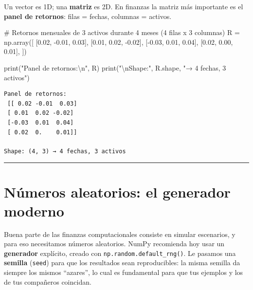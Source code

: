 \documentclass[
  spanish,
  letterpaper,
  DIV=11,
  numbers=noendperiod]{scrreprt}
\newenvironment{Shaded}{\begin{snugshade}}{\end{snugshade}}
\newcommand{\BuiltInTok}[1]{\textcolor[rgb]{0.00,0.23,0.31}{#1}}
\newcommand{\CharTok}[1]{\textcolor[rgb]{0.13,0.47,0.30}{#1}}
\newcommand{\CommentTok}[1]{\textcolor[rgb]{0.37,0.37,0.37}{#1}}
\newcommand{\FloatTok}[1]{\textcolor[rgb]{0.68,0.00,0.00}{#1}}
\newcommand{\NormalTok}[1]{\textcolor[rgb]{0.00,0.23,0.31}{#1}}
\newcommand{\OperatorTok}[1]{\textcolor[rgb]{0.37,0.37,0.37}{#1}}
\newcommand{\StringTok}[1]{\textcolor[rgb]{0.13,0.47,0.30}{#1}}
\begin{document}
Un vector es 1D; una \textbf{matriz} es 2D. En finanzas la matriz más
importante es el \textbf{panel de retornos}: filas = fechas, columnas =
activos.

\label{matriz}
\begin{Shaded}
\begin{Highlighting}[]
\CommentTok{\# Retornos mensuales de 3 activos durante 4 meses (4 filas x 3 columnas)}
\NormalTok{R }\OperatorTok{=}\NormalTok{ np.array([}
\NormalTok{    [}\FloatTok{0.02}\NormalTok{, }\OperatorTok{{-}}\FloatTok{0.01}\NormalTok{,  }\FloatTok{0.03}\NormalTok{],}
\NormalTok{    [}\FloatTok{0.01}\NormalTok{,  }\FloatTok{0.02}\NormalTok{, }\OperatorTok{{-}}\FloatTok{0.02}\NormalTok{],}
\NormalTok{    [}\OperatorTok{{-}}\FloatTok{0.03}\NormalTok{, }\FloatTok{0.01}\NormalTok{,  }\FloatTok{0.04}\NormalTok{],}
\NormalTok{    [}\FloatTok{0.02}\NormalTok{,  }\FloatTok{0.00}\NormalTok{,  }\FloatTok{0.01}\NormalTok{],}
\NormalTok{])}

\BuiltInTok{print}\NormalTok{(}\StringTok{"Panel de retornos:}\CharTok{\textbackslash{}n}\StringTok{"}\NormalTok{, R)}
\BuiltInTok{print}\NormalTok{(}\StringTok{"}\CharTok{\textbackslash{}n}\StringTok{Shape:"}\NormalTok{, R.shape, }\StringTok{"→ 4 fechas, 3 activos"}\NormalTok{)}
\end{Highlighting}
\end{Shaded}

\begin{verbatim}
Panel de retornos:
 [[ 0.02 -0.01  0.03]
 [ 0.01  0.02 -0.02]
 [-0.03  0.01  0.04]
 [ 0.02  0.    0.01]]

Shape: (4, 3) → 4 fechas, 3 activos
\end{verbatim}

\begin{center}\rule{0.5\linewidth}{0.5pt}\end{center}

\section{Números aleatorios: el generador
moderno}\label{nuxfameros-aleatorios-el-generador-moderno}

Buena parte de las finanzas computacionales consiste en simular
escenarios, y para eso necesitamos números aleatorios. NumPy recomienda
hoy usar un \textbf{generador} explícito, creado con
\texttt{np.random.default\_rng()}. Le pasamos una \textbf{semilla}
(\texttt{seed}) para que los resultados sean reproducibles: la misma
semilla da siempre los mismos ``azares'', lo cual es fundamental para
que tus ejemplos y los de tus compañeros coincidan.
\end{document}
